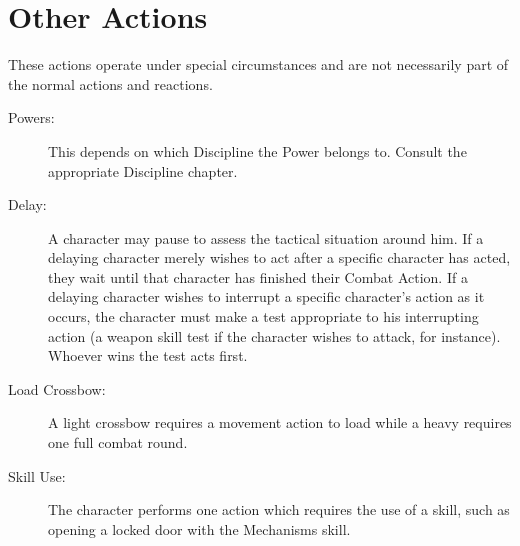






\section{Other Actions}
These actions operate under special circumstances and are not necessarily part of the normal actions and reactions.

\begin{description}
\item[Powers:] This depends on which Discipline the Power belongs to. Consult the appropriate Discipline chapter.
\item[Delay:] A character may pause to assess the tactical situation around him. If a delaying character merely wishes to act after a specific character has acted, they wait until that character has finished their Combat Action. If a delaying character wishes to interrupt a specific character’s action as it occurs, the character must make a test appropriate to his interrupting action (a weapon skill test if the character wishes to attack, for instance). Whoever wins the test acts first. 
\item[Load Crossbow:] A light crossbow requires a movement action to load while a heavy requires one full combat round.
\item[Skill Use:] The character performs one action which requires the use of a skill, such as opening a locked door with the Mechanisms skill.
\end{description}



